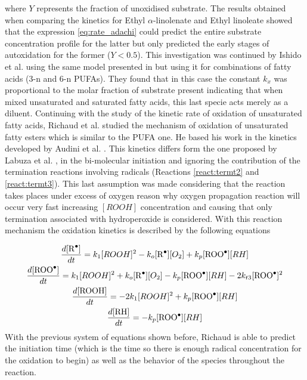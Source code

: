 \begin{refsection}
where $Y$ represents the fraction of unoxidised substrate. The results obtained when comparing the kinetics for Ethyl $\alpha$-linolenate and Ethyl linoleate showed that the expression \ref{eq:rate_adachi} could predict the entire substrate concentration profile for the latter but only predicted the early stages of autoxidation for the former ($Y<0.5$). This investigation was continued by  Ishido et al. \cite{Ishido2001OxidationEster} using the same model presented in \cite{Adachi1995AutoxidationEsters} but using it for combinations of fatty acids (3-n and 6-n PUFAs). They found that in this case the constant $k_x$ was proportional to the molar fraction of substrate present indicating that when mixed unsaturated and saturated fatty acids, this last specie acts merely as a diluent.  
Continuing with the study of the kinetic rate of oxidation  of unsaturated fatty acids, Richaud et al. \cite{Richaud2012RateChemiluminescence} studied the mechanism of oxidation of unsaturated fatty esters which is similar to the PUFA one. He based his work in the kinetics developed by Audini et al. \cite{audouin1995close}. This kinetics differs form the one proposed by  Labuza et al. \cite{Labuza1971KineticsFoods}, in the bi-molecular initiation and ignoring the  contribution of the termination reactions involving  radicals (Reactions \ref{react:termt2}
 and \ref{react:termt3}). This last assumption was made considering that the reaction takes places under excess of oxygen reason why oxygen propagation reaction will occur very fast increasing $[ROOH]$ concentration and causing that only termination associated with hydroperoxide is considered. With this reaction mechanism the oxidation kinetics is described by the following equations 
 
  \begin{gather}
     \frac{d[\ce{R^.}]}{dt}=k_1[ROOH]^2-k_o[\ce{R^.}][O_2]+k_p[\ce{ROO^.}][RH]\\
     \frac{d[\ce{ROO^.}]}{dt}=k_1[ROOH]^2+k_o[\ce{R^.}][O_2]-k_p[\ce{ROO^.}][RH]-2k_{t3}[\ce{ROO^.}]^2\\
     \frac{d[\ce{ROOH}]}{dt}=-2k_1[ROOH]^2+k_p[\ce{ROO^.}][RH]\\
     \frac{d[\ce{RH}]}{dt}=-k_p[\ce{ROO^.}][RH]
 \end{gather}
 With the previous system of equations shown before, Richaud is able to predict the initiation time (which is the time so there is enough radical concentration for the oxidation to begin) as well as the behavior of the species throughout the reaction. 
 

\end{refsection}
